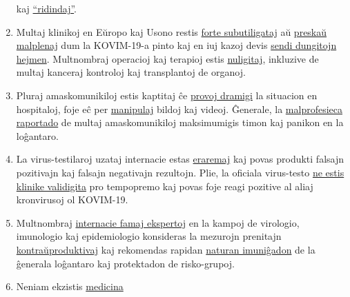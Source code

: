 \begin{enumerate}
  kaj
  \href{https://www.aerztezeitung.de/Politik/Montgomery-haelt-Maskenpflicht-fuer-falsch-408844.html}{``ridindaj''}.
\item
  Multaj klinikoj en Eŭropo kaj Usono restis
  \href{https://www.hsj.co.uk/acute-care/nhs-hospitals-have-four-times-more-empty-beds-than-normal/7027392.article}{forte
  subutiligataj} aŭ
  \href{https://www.sfchronicle.com/bayarea/article/Stanford-hospital-system-to-cut-pay-20-furlough-15227591.php}{preskaŭ
  malplenaj} dum la KOVIM-19-a pinto kaj en iuj kazoj devis
  \href{https://www.usatoday.com/story/news/health/2020/04/02/coronavirus-pandemic-jobs-us-health-care-workers-furloughed-laid-off/5102320002/}{sendi
  dungitojn hejmen}. Multnombraj operacioj kaj terapioj estis
  \href{https://www.birmingham.ac.uk/news/latest/2020/05/covid-disruption-28-million-surgeries-cancelled.aspx}{nuligitaj},
  inkluzive de multaj kanceraj kontroloj kaj transplantoj de organoj.
\item
  Pluraj amaskomunikiloj estis kaptitaj ĉe
  \href{https://nypost.com/2020/04/01/cbs-admits-to-using-footage-from-italy-in-report-about-nyc/}{provoj
  dramigi} la situacion en hospitaloj, foje eĉ per
  \href{https://www.wsj.com/articles/cbs-says-fake-news-wasnt-theirs-11588789238}{manipulaj}
  bildoj kaj videoj. Ĝenerale, la
  \href{https://onlinelibrary.wiley.com/doi/full/10.1111/eci.13222}{malprofesieca
  raportado} de multaj amaskomunikiloj maksimumigis timon kaj panikon en
  la loĝantaro.
\item
  La virus-testilaroj uzataj internacie estas
  \href{https://www.ncbi.nlm.nih.gov/pubmed/32219885}{eraremaj} kaj
  povas produkti falsajn pozitivajn kaj falsajn negativajn rezultojn.
  Plie, la oficiala virus-testo
  \href{https://www.youtube.com/watch?v=p_AyuhbnPOI}{ne estis klinike
  validigita} pro tempopremo kaj povas foje reagi pozitive al aliaj
  kronvirusoj ol KOVIM-19.
\item
  Multnombraj
  \href{https://off-guardian.org/2020/03/24/12-experts-questioning-the-coronavirus-panic/}{internacie
  famaj ekspertoj} en la kampoj de virologio, imunologio kaj
  epidemiologio konsideras la mezurojn prenitajn
  \href{https://off-guardian.org/2020/03/28/10-more-experts-criticising-the-coronavirus-panic/}{kontraŭproduktivaj}
  kaj rekomendas rapidan
  \href{https://off-guardian.org/2020/04/17/8-more-experts-questioning-the-coronavirus-panic/}{naturan
  imuniĝadon} de la ĝenerala loĝantaro kaj protektadon de risko-grupoj.
\item
  Neniam ekzistis
  \href{https://www.thelancet.com/journals/lanchi/article/PIIS2352-4642(20)30095-X/fulltext}{medicina
}
\end{enumerate}
